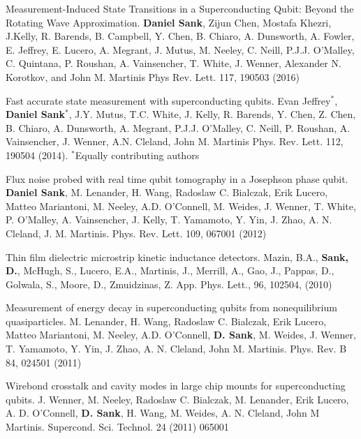 \documentclass[margin=2cm,line]{res}
\begin{document}
\begin{resume}
\begin{list3}

\item Measurement-Induced State Transitions in a Superconducting Qubit: Beyond the Rotating Wave Approximation. \textbf{Daniel Sank}, Zijun Chen, Mostafa Khezri, J.Kelly, R. Barends, B. Campbell, Y. Chen, B. Chiaro, A. Dunsworth, A. Fowler, E. Jeffrey, E. Lucero, A. Megrant, J. Mutus, M. Neeley, C. Neill, P.J.J. O'Malley, C. Quintana, P. Roushan, A. Vainsencher, T. White, J. Wenner, Alexander N. Korotkov, and John M. Martinis Phys Rev. Lett. 117, 190503 (2016) \\

\item Fast accurate state measurement with superconducting qubits. Evan Jeffrey$^*$, \textbf{Daniel Sank}$^*$, J.Y. Mutus, T.C. White, J. Kelly, R. Barends, Y. Chen, Z. Chen, B. Chiaro, A. Dunsworth, A. Megrant, P.J.J. O'Malley, C. Neill, P. Roushan, A. Vainsencher, J. Wenner, A.N. Cleland, John M. Martinis Phys. Rev. Lett. 112, 190504 (2014). $^*$Equally contributing authors\\

\item Flux noise probed with real time qubit tomography in a Josephson phase qubit. \textbf{Daniel Sank}, M. Lenander, H. Wang, Radoslaw C. Bialczak, Erik Lucero, Matteo Mariantoni, M. Neeley, A.D. O'Connell, M. Weides, J. Wenner, T. White, P. O'Malley, A. Vainsencher, J. Kelly, T. Yamamoto, Y. Yin, J. Zhao, A. N. Cleland, J. M. Martinis. Phys. Rev. Lett. 109, 067001 (2012) \\

\item Thin film dielectric microstrip kinetic inductance detectors. Mazin, B.A., \textbf{Sank, D.}, McHugh, S., Lucero, E.A., Martinis, J., Merrill, A., Gao, J., Pappas, D., Golwala, S., Moore, D., Zmuidzinas, Z. App. Phys. Lett., 96, 102504, (2010) \\

\item Measurement of energy decay in superconducting qubits from nonequilibrium quasiparticles. M. Lenander, H. Wang, Radoslaw C. Bialczak, Erik Lucero, Matteo Mariantoni, M. Neeley, A.D. O'Connell, \textbf{D. Sank}, M. Weides, J. Wenner, T. Yamamoto, Y. Yin, J. Zhao, A. N. Cleland, John M. Martinis. Phys. Rev. B 84, 024501 (2011)

\item Wirebond crosstalk and cavity modes in large chip mounts for superconducting qubits. J. Wenner, M. Neeley, Radoslaw C. Bialczak, M. Lenander, Erik Lucero, A. D. O'Connell, \textbf{D. Sank}, H. Wang, M. Weides, A. N. Cleland, John M Martinis. Supercond. Sci. Technol. 24 (2011) 065001 \\


\end{list3}
\end{resume}
\end{document}

